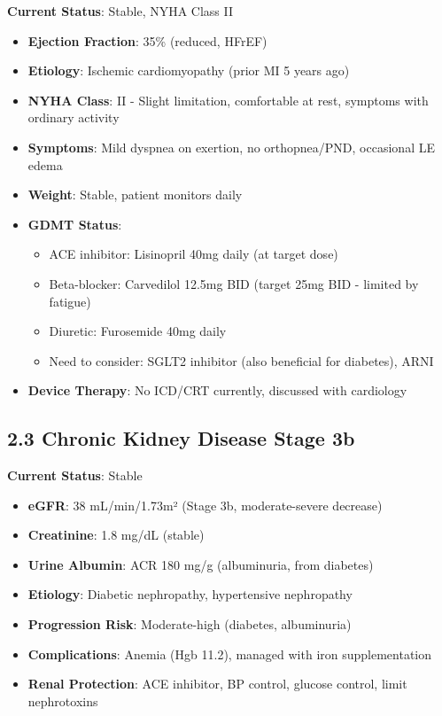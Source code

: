 \documentclass[11pt,letterpaper]{article}
\begin{document}
\textbf{Current Status}: Stable, NYHA Class II
\begin{itemize}[leftmargin=*]
    \item \textbf{Ejection Fraction}: 35\% (reduced, HFrEF)
    \item \textbf{Etiology}: Ischemic cardiomyopathy (prior MI 5 years ago)
    \item \textbf{NYHA Class}: II - Slight limitation, comfortable at rest, symptoms with ordinary activity
    \item \textbf{Symptoms}: Mild dyspnea on exertion, no orthopnea/PND, occasional LE edema
    \item \textbf{Weight}: Stable, patient monitors daily
    \item \textbf{GDMT Status}:
    \begin{itemize}
        \item ACE inhibitor: Lisinopril 40mg daily (at target dose)
        \item Beta-blocker: Carvedilol 12.5mg BID (target 25mg BID - limited by fatigue)
        \item Diuretic: Furosemide 40mg daily
        \item Need to consider: SGLT2 inhibitor (also beneficial for diabetes), ARNI
    \end{itemize}
    \item \textbf{Device Therapy}: No ICD/CRT currently, discussed with cardiology
\end{itemize}

\subsection*{2.3 Chronic Kidney Disease Stage 3b}

\textbf{Current Status}: Stable
\begin{itemize}[leftmargin=*]
    \item \textbf{eGFR}: 38 mL/min/1.73m² (Stage 3b, moderate-severe decrease)
    \item \textbf{Creatinine}: 1.8 mg/dL (stable)
    \item \textbf{Urine Albumin}: ACR 180 mg/g (albuminuria, from diabetes)
    \item \textbf{Etiology}: Diabetic nephropathy, hypertensive nephropathy
    \item \textbf{Progression Risk}: Moderate-high (diabetes, albuminuria)
    \item \textbf{Complications}: Anemia (Hgb 11.2), managed with iron supplementation
    \item \textbf{Renal Protection}: ACE inhibitor, BP control, glucose control, limit nephrotoxins
\end{itemize}
\end{document}
